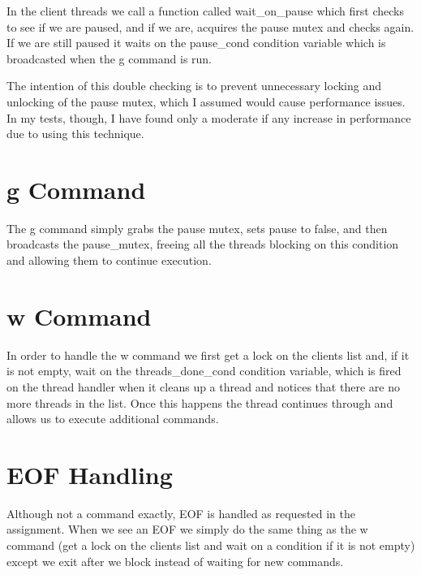 \documentclass[paper=a4, fontsize=11pt]{scrartcl} %
\numberwithin{equation}{section} %
\numberwithin{figure}{section} %
\numberwithin{table}{section} %
\begin{document}
In the client threads we call a function called wait_on_pause which first checks to see if we are paused, and if we are, acquires the pause mutex and checks again.  If we are still paused it waits on the pause_cond condition variable which is broadcasted when the g command is run.

The intention of this double checking is to prevent unnecessary locking and unlocking of the pause mutex, which I assumed would cause performance issues.  In my tests, though, I have found only a moderate if any increase in performance due to using this technique.

\section{g Command}

The g command simply grabs the pause mutex, sets pause to false, and then broadcasts the pause_mutex, freeing all the threads blocking on this condition and allowing them to continue execution.

\section{w Command}

In order to handle the w command we first get a lock on the clients list and, if it is not empty, wait on the threads_done_cond condition variable, which is fired on the thread handler when it cleans up a thread and notices that there are no more threads in the list.  Once this happens the thread continues through and allows us to execute additional commands.

\section{EOF Handling}

Although not a command exactly, EOF is handled as requested in the assignment.  When we see an EOF we simply do the same thing as the w command (get a lock on the clients list and wait on a condition if it is not empty) except we exit after we block instead of waiting for new commands.
\end{document}
